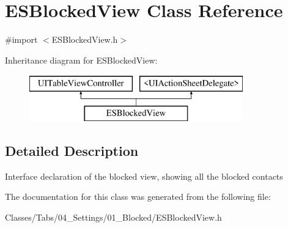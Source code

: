 \hypertarget{interface_e_s_blocked_view}{}\section{E\+S\+Blocked\+View Class Reference}
\label{interface_e_s_blocked_view}


{\ttfamily \#import $<$E\+S\+Blocked\+View.\+h$>$}

Inheritance diagram for E\+S\+Blocked\+View\+:\begin{figure}[H]
\begin{center}
\leavevmode
\includegraphics[height=2.000000cm]{interface_e_s_blocked_view}
\end{center}
\end{figure}


\subsection{Detailed Description}
Interface declaration of the blocked view, showing all the blocked contacts 

The documentation for this class was generated from the following file\+:\begin{DoxyCompactItemize}
\item 
Classes/\+Tabs/04\+\_\+\+Settings/01\+\_\+\+Blocked/E\+S\+Blocked\+View.\+h\end{DoxyCompactItemize}
